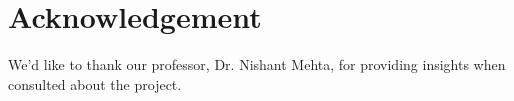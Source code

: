 \section*{Acknowledgement}

We'd like to thank our professor, Dr. Nishant Mehta, for providing insights when consulted about the project.